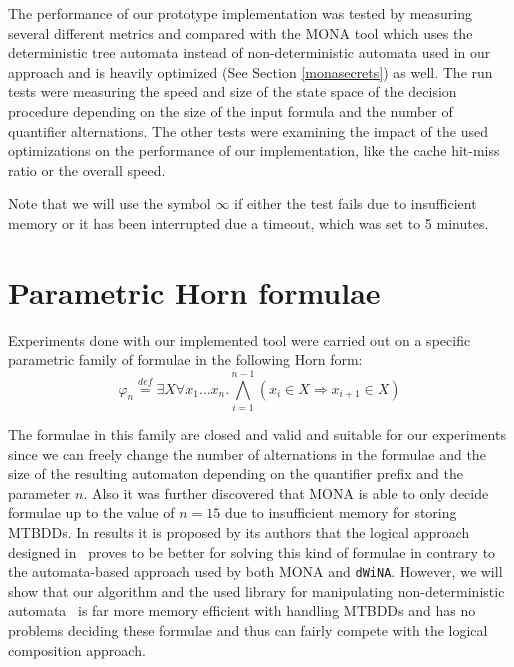 The performance of our prototype implementation was tested by measuring several
different metrics and compared with the \textsc{MONA} tool which uses the
deterministic tree automata instead of non-deterministic automata used in our
approach and is heavily optimized (See Section \ref{monasecrets}) as well.
The run tests were measuring the speed and size of the state space of
the decision procedure depending on the size of the input formula and the number
of quantifier alternations. The other tests were examining the impact of the
used optimizations on the performance of our implementation, like the cache hit-miss
ratio or the overall speed.

Note that we will use the symbol $\infty$ if either the test fails due to
insufficient memory or it has been interrupted due a timeout, which was set to 5
minutes.

\section{Parametric Horn formulae}

Experiments done with our implemented tool were carried out
on a specific parametric family of formulae in the following Horn form:
\begin{equation}\label{horn}
 \varphi_n \overset{\mathit{def}}{=} \exists X\forall x_1\ldots x_n.
 \bigwedge_{i = 1}^{n-1} (x_i \in X \Rightarrow x_{i+1} \in X)
\end{equation}

The formulae in this family are closed and valid and suitable for
our experiments since we can freely change the number of alternations in
the formulae and the size of the resulting automaton depending on the quantifier
prefix and the parameter $n$.
Also it was further discovered that \textsc{MONA} is able to only decide
formulae up to the value of $n = 15$ due to insufficient memory for storing
MTBDDs.
In results it is proposed by its authors that the logical approach designed
in~\cite{logic-approach} proves to be better for solving this kind of formulae
in contrary to the automata-based approach used by both \textsc{MONA} and
\texttt{dWiNA}. However, we will show that our algorithm and the used library
for manipulating non-deterministic automata~\cite{vata-tool} is far more memory
efficient with handling MTBDDs and has no problems deciding these formulae and
thus can fairly compete with the logical composition approach.

